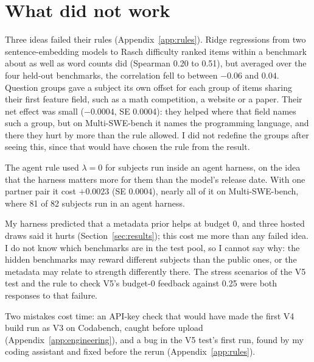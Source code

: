 \section{What did not work}\label{sec:analysis}

Three ideas failed their rules (Appendix~\ref{app:rules}). Ridge regressions from two sentence-embedding models to Rasch difficulty ranked items within a benchmark about as well as word counts did (Spearman 0.20 to 0.51), but averaged over the four held-out benchmarks, the correlation fell to between $-0.06$ and $0.04$. Question groups gave a subject its own offset for each group of items sharing their first feature field, such as a math competition, a website or a paper. Their net effect was small ($-0.0004$, SE 0.0004): they helped where that field names such a group, but on Multi-SWE-bench it names the programming language, and there they hurt by more than the rule allowed. I did not redefine the groups after seeing this, since that would have chosen the rule from the result.

The agent rule used $\lambda = 0$ for subjects run inside an agent harness, on the idea that the harness matters more for them than the model's release date. With one partner pair it cost $+0.0023$ (SE 0.0004), nearly all of it on Multi-SWE-bench, where 81 of 82 subjects run in an agent harness.

My harness predicted that a metadata prior helps at budget 0, and three hosted draws said it hurts (Section~\ref{sec:results}); this cost me more than any failed idea. I do not know which benchmarks are in the test pool, so I cannot say why: the hidden benchmarks may reward different subjects than the public ones, or the metadata may relate to strength differently there. The stress scenarios of the V5 test and the rule to check V5's budget-0 feedback against 0.25 were both responses to that failure.

Two mistakes cost time: an API-key check that would have made the first V4 build run as V3 on Codabench, caught before upload (Appendix~\ref{app:engineering}), and a bug in the V5 test's first run, found by my coding assistant and fixed before the rerun (Appendix~\ref{app:rules}).
